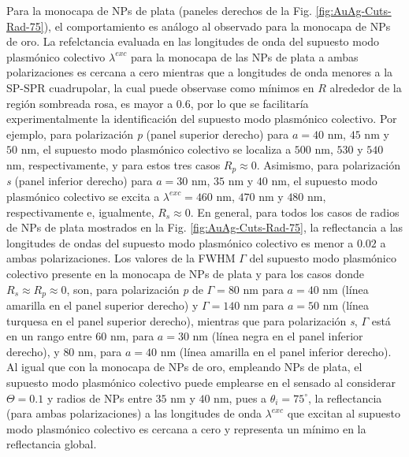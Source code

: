 Para la monocapa de NPs de plata (paneles derechos de la Fig. \ref{fig:AuAg-Cuts-Rad-75}), el comportamiento es análogo al observado para la monocapa de NPs de oro. La refelctancia evaluada en las longitudes de onda del supuesto modo plasmónico colectivo $\lambda^{exc}$ para la monocapa de las NPs de plata a ambas polarizaciones es cercana a cero mientras que a longitudes de onda menores a la SP-SPR cuadrupolar, la cual puede observase como mínimos en $R$ alrededor de la región sombreada rosa, es mayor a $0.6$, por lo que se facilitaría experimentalmente la identificación del supuesto modo plasmónico colectivo. Por ejemplo, para polarización \emph{p} (panel superior derecho) para $a=40$ nm, $45$ nm y $50$ nm, el supuesto modo plasmónico colectivo se localiza a $500$ nm, $530$ y $540$ nm, respectivamente, y para estos tres casos $R_p\approx 0$. Asimismo, para polarización \emph{s} (panel inferior derecho) para $a=30$ nm, $35$ nm y $40$ nm, el supuesto modo plasmónico colectivo se excita a $\lambda^{exc}=460$ nm, $470$ nm y $480$ nm, respectivamente e, igualmente, $R_s\approx 0$. En general, para todos los casos de radios de NPs de plata mostrados en la Fig. \ref{fig:AuAg-Cuts-Rad-75}, la reflectancia a las longitudes de ondas del supuesto modo plasmónico colectivo es menor a $0.02$ a ambas polarizaciones. Los valores de la FWHM $\Gamma$ del supuesto modo plasmónico colectivo presente en la monocapa de NPs de plata y para los casos donde $R_s\approx R_p \approx 0$, son, para polarización \emph{p} de $\Gamma=80$ nm para $a=40$ nm (línea amarilla en el panel superior derecho) y $\Gamma=140$ nm para $a=50$ nm (línea turquesa en el panel superior derecho), mientras que para polarización \emph{s}, $\Gamma$ está en un rango entre $60$ nm, para $a=30$ nm (línea negra en el panel inferior derecho), y $80$ nm, para $a=40$ nm (línea amarilla en el panel inferior derecho). Al igual que con la monocapa de NPs de oro, empleando NPs de plata, el supuesto modo plasmónico colectivo puede emplearse en el sensado al considerar $\Theta=0.1$ y radios de NPs entre $35$ nm y $40$ nm, pues a $\theta_i=75^\circ$, la reflectancia (para ambas polarizaciones) a las longitudes de onda  $\lambda^{exc}$ que excitan al supuesto modo plasmónico colectivo es cercana a cero y representa un mínimo en la reflectancia global.

